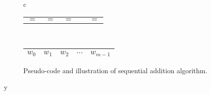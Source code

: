 \begin{figure}
\begin{minipage}{0.45\textwidth}
\begin{tabular}{c}
      \begin{tabular}{C{0.7cm}C{0.7cm}C{0.8cm}C{0.7cm}C{0.7cm}}
        $=$ & $=$ & $=$ &  & $=$  
      \end{tabular}\\
      \begin{tabular}{|C{0.7cm}|C{0.7cm}|C{0.7cm}|C{0.7cm}|C{0.7cm}|}
        \hline
        $w_{0}$ & $w_1$ & $w_2$ & $\cdots$ & $w_{m-1}$\\
        \hline
      \end{tabular}
    \end{tabular}
  \end{minipage}
  \caption{Pseudo-code and illustration of sequential addition algorithm.}
  \label{fig:addseq}
\end{figure}


y

